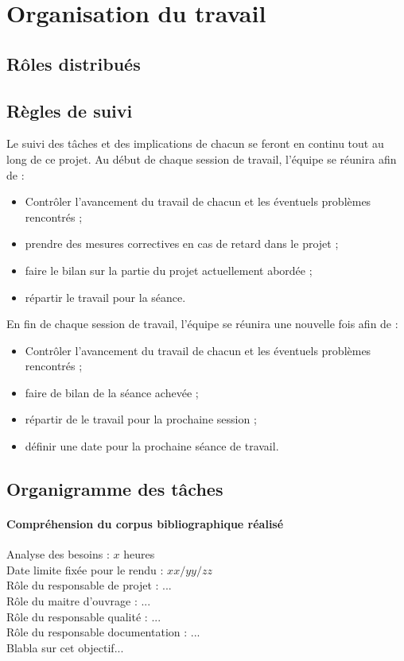\section{Organisation du travail}
\subsection{Rôles distribués}

\subsection{Règles de suivi}
Le suivi des tâches et des implications de chacun se feront en continu tout au long de ce projet. Au début de chaque session de travail, l'équipe se réunira afin de :
\begin{itemize}
  \item Contrôler l'avancement du travail de chacun et les éventuels problèmes rencontrés ;
  \item prendre des mesures correctives en cas de retard dans le projet ;
  \item faire le bilan sur la partie du projet actuellement abordée ;
  \item répartir le travail pour la séance.
\end{itemize}
En fin de chaque session de travail, l'équipe se réunira une nouvelle fois afin de :
\begin{itemize}
  \item Contrôler l'avancement du travail de chacun et les éventuels problèmes rencontrés ;
  \item faire de bilan de la séance achevée ;
  \item répartir de le travail pour la prochaine session ;
  \item définir une date pour la prochaine séance de travail.
\end{itemize}

\subsection{Organigramme des tâches}
\paragraph*{Compréhension du corpus bibliographique réalisé\\}
Analyse des besoins : $x$ heures\\
Date limite fixée pour le rendu : $xx/yy/zz$\\
Rôle du responsable de projet : ...\\
Rôle du maitre d'ouvrage : ...\\
Rôle du responsable qualité : ...\\
Rôle du responsable documentation : ...\\
Blabla sur cet objectif...

